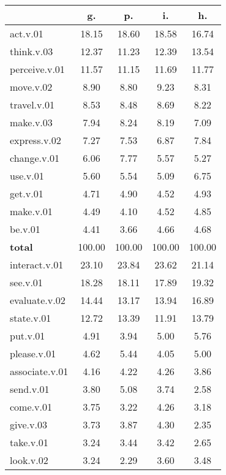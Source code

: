 \begin{table}[h!]
\begin{center}
\begin{tabular}{| l || c | c | c | c |}\hline
 & {\bf g.} & {\bf p.} & {\bf i.} & {\bf h.} \\\hline\hline
act.v.01 & 18.15  & 18.60  & 18.58  & 16.74 \\\hline
think.v.03 & 12.37  & 11.23  & 12.39  & 13.54 \\\hline
perceive.v.01 & 11.57  & 11.15  & 11.69  & 11.77 \\\hline
move.v.02 & 8.90  & 8.80  & 9.23  & 8.31 \\\hline
travel.v.01 & 8.53  & 8.48  & 8.69  & 8.22 \\\hline
make.v.03 & 7.94  & 8.24  & 8.19  & 7.09 \\\hline
express.v.02 & 7.27  & 7.53  & 6.87  & 7.84 \\\hline
change.v.01 & 6.06  & 7.77  & 5.57  & 5.27 \\\hline
use.v.01 & 5.60  & 5.54  & 5.09  & 6.75 \\\hline
get.v.01 & 4.71  & 4.90  & 4.52  & 4.93 \\\hline
make.v.01 & 4.49  & 4.10  & 4.52  & 4.85 \\\hline
be.v.01 & 4.41  & 3.66  & 4.66  & 4.68 \\\hline\hline
{{\bf total}} & 100.00  & 100.00  & 100.00  & 100.00 \\\hline\hline\hline
interact.v.01 & 23.10  & 23.84  & 23.62  & 21.14 \\\hline
see.v.01 & 18.28  & 18.11  & 17.89  & 19.32 \\\hline
evaluate.v.02 & 14.44  & 13.17  & 13.94  & 16.89 \\\hline
state.v.01 & 12.72  & 13.39  & 11.91  & 13.79 \\\hline
put.v.01 & 4.91  & 3.94  & 5.00  & 5.76 \\\hline
please.v.01 & 4.62  & 5.44  & 4.05  & 5.00 \\\hline
associate.v.01 & 4.16  & 4.22  & 4.26  & 3.86 \\\hline
send.v.01 & 3.80  & 5.08  & 3.74  & 2.58 \\\hline
come.v.01 & 3.75  & 3.22  & 4.26  & 3.18 \\\hline
give.v.03 & 3.73  & 3.87  & 4.30  & 2.35 \\\hline
take.v.01 & 3.24  & 3.44  & 3.42  & 2.65 \\\hline
look.v.02 & 3.24  & 2.29  & 3.60  & 3.48 \\\hline\hline

\end{tabular}
\end{center}
\end{table}
